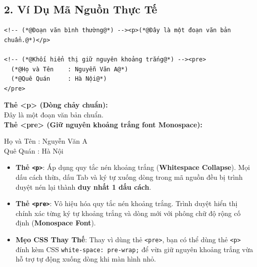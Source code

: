 \documentclass[11pt,oneside]{book}
\newcommand{\codeinline}[1]{\textcolor{accentOrange}{\texttt{#1}}}
\newcommand{\term}[1]{\textbf{\textcolor{primaryBlue}{#1}}}
\begin{document}
\subsection{2. Ví Dụ Mã Nguồn Thực Tế}
\begin{codeWindow}
\begin{lstlisting}[language=HTML5]
<!-- (*@Đoạn văn bình thường@*) --><p>(*@Đây là một đoạn văn bản chuẩn.@*)</p>

<!-- (*@Khối hiển thị giữ nguyên khoảng trắng@*) --><pre>
  (*@Họ và Tên    : Nguyễn Văn A@*)
  (*@Quê Quán     : Hà Nội@*)
</pre>
\end{lstlisting}
\end{codeWindow}

\begin{browserWindow}
\sffamily\small
\textbf{Thẻ <p> (Dòng chảy chuẩn):}\\[2pt]
Đây là một đoạn văn bản chuẩn.\\[6pt]
\textbf{Thẻ <pre> (Giữ nguyên khoảng trắng font Monospace):}\\[2pt]
\begin{tcolorbox}[colback=gray!8, colframe=gray!20, boxrule=0.5pt, arc=3pt]
\ttfamily\small
Họ và Tên    : Nguyễn Văn A\\
Quê Quán     : Hà Nội
\end{tcolorbox}
\end{browserWindow}

\begin{conceptBox}
\begin{itemize}[leftmargin=1.5em, itemsep=3pt]
    \item \textbf{Thẻ \codeinline{<p>}}: Áp dụng quy tắc nén khoảng trắng (\term{Whitespace Collapse}). Mọi dấu cách thừa, dấu Tab và ký tự xuống dòng trong mã nguồn đều bị trình duyệt nén lại thành \textbf{duy nhất 1 dấu cách}.
    \item \textbf{Thẻ \codeinline{<pre>}}: Vô hiệu hóa quy tắc nén khoảng trắng. Trình duyệt hiển thị chính xác từng ký tự khoảng trắng và dòng mới với phông chữ độ rộng cố định (\term{Monospace Font}).
    \item \textbf{Mẹo CSS Thay Thế}: Thay vì dùng thẻ \codeinline{<pre>}, bạn có thể dùng thẻ \codeinline{<p>} đính kèm CSS \codeinline{white-space: pre-wrap;} để vừa giữ nguyên khoảng trắng vừa hỗ trợ tự động xuống dòng khi màn hình nhỏ.
\end{itemize}
\end{conceptBox}
\end{document}
